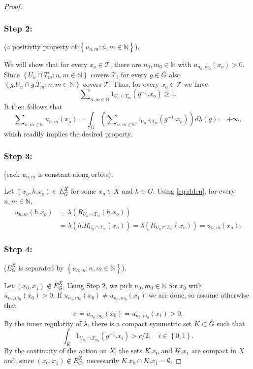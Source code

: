 \documentclass{amsart}
\numberwithin{equation}{subsection}
\begin{document}
\begin{proof}
\subsubsection*{Step 2:} (a positivity property of \(\left\{u_{n,m}:n,m\in\mathbb{N}\right\}\)).

We will show that for every \(x_{o}\in\mathcal{T}\), there are \(n_{0},m_{0}\in\mathbb{N}\) with \(u_{n_{0},m_{0}}\left(x_{o}\right)>0\). Since \(\left\{U_{n}\cap T_{m}:n,m\in\mathbb{N}\right\}\) covers \(\mathcal{T}\), for every \(g\in G\) also \(\left\{g.U_{n}\cap g.T_{m}:n,m\in\mathbb{N}\right\}\) covers \(\mathcal{T}\). Thus, for every \(x_{o}\in\mathcal{T}\) we have
\[\sum\nolimits_{n,m\in\mathbb{N}}1_{U_{n}\cap T_{m}}\left(g^{-1}.x_{o}\right)\geq1.\]
It then follows that
\[\sum\nolimits_{n,m\in\mathbb{N}}u_{n,m}\left(x_{o}\right)=\int_{G}\left(\sum\nolimits_{n,m\in\mathbb{N}}1_{U_{n}\cap T_{m}}\left(g^{-1}.x_{o}\right)\right)d\lambda\left(g\right)=+\infty,\]
which readily implies the desired property.

\subsubsection*{Step 3:} (each \(u_{n,m}\) is constant along orbits).

Let \(\left(x_{o},h.x_{o}\right)\in E_{G}^{X}\) for some \(x_{o}\in X\) and \(h\in G\). Using \eqref{eq:riden}, for every \(n,m\in\mathbb{N}\),
\begin{align*}
u_{n,m}\left(h.x_{o}\right)
&=\lambda\left(R_{U_{n}\cap T_{m}}\left(h.x_{o}\right)\right)\\
&=\lambda\left(h.R_{U_{n}\cap T_{m}}\left(x_{o}\right)\right)=\lambda\left(R_{U_{n}\cap T_{m}}\left(x_{o}\right)\right)=u_{n,m}\left(x_{o}\right).
\end{align*}

\subsubsection*{Step 4:} (\(E_{G}^{X}\) is separated by \(\left\{u_{n,m}:n,m\in\mathbb{N}\right\}\)).

Let \(\left(x_{0},x_{1}\right)\notin E_{G}^{X}\). Using Step 2, we pick \(n_{0},m_{0}\in\mathbb{N}\) for \(x_{0}\) with \(u_{n_{0},m_{0}}\left(x_{0}\right)>0\). If \(u_{n_{0},m_{0}}\left(x_{0}\right)\neq u_{n_{0},m_{0}}\left(x_{1}\right)\) we are done, so assume otherwise that 
\[c\coloneqq u_{n_{0},m_{0}}\left(x_{0}\right)=u_{n_{0},m_{0}}\left(x_{1}\right)>0.\]
By the inner regularity of \(\lambda\), there is a compact symmetric set \(K\subset G\) such that
\[\int_{K}1_{U_{n_{0}}\cap T_{m_{0}}}\left(g^{-1}.x_{i}\right)>c/2,\quad i\in\left\{ 0,1\right\}.\]
By the continuity of the action on \(\overline{X}\), the sets \(K.x_{0}\) and \(K.x_{1}\) are compact in \(\overline{X}\) and, since \(\left(x_{0},x_{1}\right)\notin E_{G}^{X}\), necessarily \(K.x_{0}\cap K.x_{1}=\emptyset\).


\end{proof}
\end{document}
